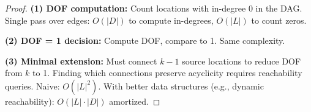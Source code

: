 \begin{proof}
\textbf{(1) DOF computation:} Count locations with in-degree 0 in the DAG. Single pass over edges: $O(|D|)$ to compute in-degrees, $O(|L|)$ to count zeros.

\textbf{(2) DOF = 1 decision:} Compute DOF, compare to 1. Same complexity.

\textbf{(3) Minimal extension:} Must connect $k-1$ source locations to reduce DOF from $k$ to 1. Finding which connections preserve acyclicity requires reachability queries. Naive: $O(|L|^2)$. With better data structures (e.g., dynamic reachability): $O(|L| \cdot |D|)$ amortized.
\end{proof}

